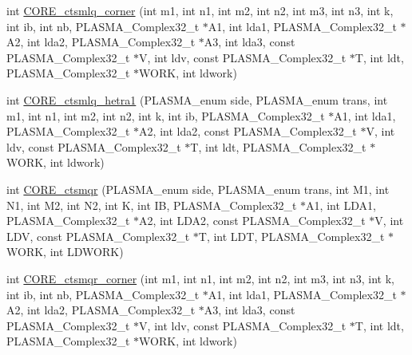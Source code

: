\begin{DoxyCompactItemize}
int \hyperlink{group__CORE__PLASMA__Complex32__t_ga28e9737a152c45e8f38de6f7f26c251e_ga28e9737a152c45e8f38de6f7f26c251e}{C\+O\+R\+E\+\_\+ctsmlq\+\_\+corner} (int m1, int n1, int m2, int n2, int m3, int n3, int k, int ib, int nb, P\+L\+A\+S\+M\+A\+\_\+\+Complex32\+\_\+t $\ast$A1, int lda1, P\+L\+A\+S\+M\+A\+\_\+\+Complex32\+\_\+t $\ast$A2, int lda2, P\+L\+A\+S\+M\+A\+\_\+\+Complex32\+\_\+t $\ast$A3, int lda3, const P\+L\+A\+S\+M\+A\+\_\+\+Complex32\+\_\+t $\ast$V, int ldv, const P\+L\+A\+S\+M\+A\+\_\+\+Complex32\+\_\+t $\ast$T, int ldt, P\+L\+A\+S\+M\+A\+\_\+\+Complex32\+\_\+t $\ast$W\+O\+R\+K, int ldwork)
\item 
int \hyperlink{group__CORE__PLASMA__Complex32__t_gae4f109ffb197e06b188dc3a7cc697261_gae4f109ffb197e06b188dc3a7cc697261}{C\+O\+R\+E\+\_\+ctsmlq\+\_\+hetra1} (P\+L\+A\+S\+M\+A\+\_\+enum side, P\+L\+A\+S\+M\+A\+\_\+enum trans, int m1, int n1, int m2, int n2, int k, int ib, P\+L\+A\+S\+M\+A\+\_\+\+Complex32\+\_\+t $\ast$A1, int lda1, P\+L\+A\+S\+M\+A\+\_\+\+Complex32\+\_\+t $\ast$A2, int lda2, const P\+L\+A\+S\+M\+A\+\_\+\+Complex32\+\_\+t $\ast$V, int ldv, const P\+L\+A\+S\+M\+A\+\_\+\+Complex32\+\_\+t $\ast$T, int ldt, P\+L\+A\+S\+M\+A\+\_\+\+Complex32\+\_\+t $\ast$W\+O\+R\+K, int ldwork)
\item 
int \hyperlink{group__CORE__PLASMA__Complex32__t_gaafe02678a5ac0b0359bb2a14ccb831a7_gaafe02678a5ac0b0359bb2a14ccb831a7}{C\+O\+R\+E\+\_\+ctsmqr} (P\+L\+A\+S\+M\+A\+\_\+enum side, P\+L\+A\+S\+M\+A\+\_\+enum trans, int M1, int N1, int M2, int N2, int K, int I\+B, P\+L\+A\+S\+M\+A\+\_\+\+Complex32\+\_\+t $\ast$A1, int L\+D\+A1, P\+L\+A\+S\+M\+A\+\_\+\+Complex32\+\_\+t $\ast$A2, int L\+D\+A2, const P\+L\+A\+S\+M\+A\+\_\+\+Complex32\+\_\+t $\ast$V, int L\+D\+V, const P\+L\+A\+S\+M\+A\+\_\+\+Complex32\+\_\+t $\ast$T, int L\+D\+T, P\+L\+A\+S\+M\+A\+\_\+\+Complex32\+\_\+t $\ast$W\+O\+R\+K, int L\+D\+W\+O\+R\+K)
\item 
int \hyperlink{group__CORE__PLASMA__Complex32__t_gaec4d357be756fd805fbbf60b79cbc735_gaec4d357be756fd805fbbf60b79cbc735}{C\+O\+R\+E\+\_\+ctsmqr\+\_\+corner} (int m1, int n1, int m2, int n2, int m3, int n3, int k, int ib, int nb, P\+L\+A\+S\+M\+A\+\_\+\+Complex32\+\_\+t $\ast$A1, int lda1, P\+L\+A\+S\+M\+A\+\_\+\+Complex32\+\_\+t $\ast$A2, int lda2, P\+L\+A\+S\+M\+A\+\_\+\+Complex32\+\_\+t $\ast$A3, int lda3, const P\+L\+A\+S\+M\+A\+\_\+\+Complex32\+\_\+t $\ast$V, int ldv, const P\+L\+A\+S\+M\+A\+\_\+\+Complex32\+\_\+t $\ast$T, int ldt, P\+L\+A\+S\+M\+A\+\_\+\+Complex32\+\_\+t $\ast$W\+O\+R\+K, int ldwork)
\item 

\end{DoxyCompactItemize}
